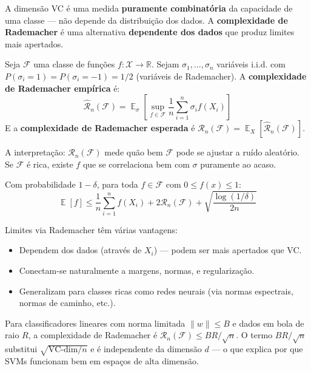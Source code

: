 \documentclass{tufte-handout}
\DeclareMathOperator{\E}{\mathbb{E}}
\begin{document}
A dimensão VC é uma medida \textbf{puramente combinatória} da capacidade de uma classe --- não depende da distribuição dos dados. A \textbf{complexidade de Rademacher} é uma alternativa \textbf{dependente dos dados} que produz limites mais apertados.

\begin{defn}
    Seja $\mathcal{F}$ uma classe de funções $f: \mathcal{X} \to \mathbb{R}$. Sejam $\sigma_1, \dots, \sigma_n$ variáveis i.i.d. com $P(\sigma_i = 1) = P(\sigma_i = -1) = 1/2$ (variáveis de Rademacher). A \textbf{complexidade de Rademacher empírica} é:
    \[
    \hat{\mathcal{R}}_n(\mathcal{F}) = \E_\sigma\!\left[\sup_{f \in \mathcal{F}} \frac{1}{n} \sum_{i=1}^n \sigma_i f(X_i)\right]
    \]
    E a \textbf{complexidade de Rademacher esperada} é $\mathcal{R}_n(\mathcal{F}) = \E_X[\hat{\mathcal{R}}_n(\mathcal{F})]$.
\end{defn}

A interpretação: $\mathcal{R}_n(\mathcal{F})$ mede quão bem $\mathcal{F}$ pode se ajustar a ruído aleatório. Se $\mathcal{F}$ é rica, existe $f$ que se correlaciona bem com $\sigma$ puramente ao acaso.

\begin{thm}
    Com probabilidade $1 - \delta$, para toda $f \in \mathcal{F}$ com $0 \le f(x) \le 1$:
    \[
    \E[f] \le \frac{1}{n} \sum_{i=1}^n f(X_i) + 2\mathcal{R}_n(\mathcal{F}) + \sqrt{\frac{\log(1/\delta)}{2n}}
    \]
\end{thm}

Limites via Rademacher têm várias vantagens:
\begin{itemize}
    \item Dependem dos dados (através de $X_i$) --- podem ser mais apertados que VC.
    \item Conectam-se naturalmente a margens, normas, e regularização.
    \item Generalizam para classes ricas como redes neurais (via normas espectrais, normas de caminho, etc.).
\end{itemize}

\begin{exmp}
    Para classificadores lineares com norma limitada $\|w\| \le B$ e dados em bola de raio $R$, a complexidade de Rademacher é $\mathcal{R}_n(\mathcal{F}) \le BR/\sqrt{n}$. O termo $BR/\sqrt{n}$ substitui $\sqrt{\text{VC-dim}/n}$ e é independente da dimensão $d$ --- o que explica por que SVMs funcionam bem em espaços de alta dimensão.
\end{exmp}
\end{document}

